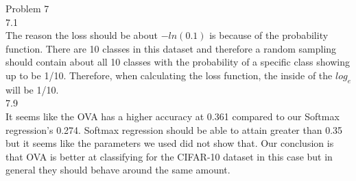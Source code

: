 \documentclass[12pt]{article}
\begin{document}
Problem 7\\
7.1\\
The reason the loss should be about $-ln(0.1)$ is because of the probability function. There are 10 classes in this
dataset and therefore a random sampling should contain about all 10 classes with the probability of a specific class
showing up to be 1/10. Therefore, when calculating the loss function, the inside of the $log_e$ will be 1/10.
\\
7.9\\
It seems like the OVA has a higher accuracy at 0.361 compared to our Softmax regression's 0.274. Softmax regression should be able to attain greater than 0.35 but it seems like the parameters we used did not show that. Our conclusion is that OVA is better at classifying for the CIFAR-10 dataset in this case but in general they should behave around the same amount. 
\end{document}
